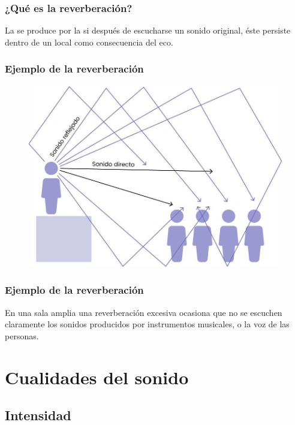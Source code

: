 \documentclass[14pt]{beamer}
\begin{document}
\begin{frame}
\frametitle{¿Qué es la reverberación?}
La  se produce por la  \pause si después de escucharse un sonido original, éste persiste dentro de un local como consecuencia del eco.
\end{frame}
\begin{frame}
\frametitle{Ejemplo de la reverberación}
\begin{figure}
    \centering
    \includegraphics[scale=0.9]{Imagenes/Reverberacion_01.jpg}
\end{figure}
\end{frame}
\begin{frame}
\frametitle{Ejemplo de la reverberación}
En una sala amplia una reverberación excesiva ocasiona que no se escuchen claramente los sonidos producidos por instrumentos musicales, o la voz de las personas.
\end{frame}

\section{Cualidades del sonido}
\subsection{Intensidad}
\end{document}
